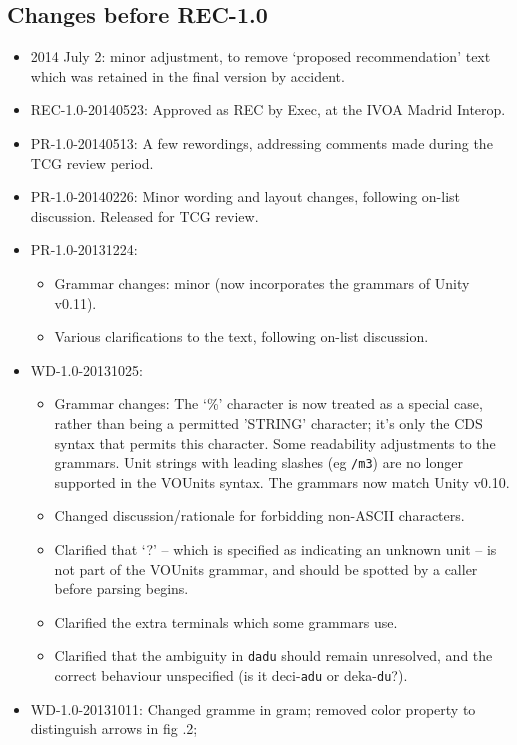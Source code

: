 \documentclass[11pt,a4paper]{ivoa}
\newcommand{\unit}[1]{\texttt{\small\color{orange}#1}}
\begin{document}
\subsection{Changes before REC-1.0}

\begin{itemize}
\item 2014 July 2: minor adjustment, to remove `proposed
recommendation' text which was retained in the final version by accident.
\item REC-1.0-20140523: Approved as REC by Exec, at the IVOA Madrid Interop.
\item PR-1.0-20140513:
A few rewordings, addressing comments made during the TCG review period.
\item PR-1.0-20140226:
Minor wording and layout changes, following on-list discussion.
Released for TCG review.
\item PR-1.0-20131224:
\begin{itemize}
\item Grammar changes: minor (now incorporates the grammars of Unity v0.11).
\item Various clarifications to the text, following on-list discussion.
\end{itemize}
\item WD-1.0-20131025:
\begin{itemize}
\item Grammar changes: The `\%' character is now treated as a special
    case, rather than being a permitted 'STRING' character; it's only
    the CDS syntax that permits this character.  Some readability
    adjustments to the grammars.  Unit strings with leading slashes
    (eg \unit{/m3}) are no longer supported in the VOUnits syntax.
    The grammars now match Unity v0.10.
\item Changed discussion/rationale for forbidding non-ASCII
    characters.
\item Clarified that `?' -- which is specified as indicating an
    unknown unit -- is not part of the VOUnits grammar, and should be
    spotted by a caller before parsing begins.
\item Clarified the extra terminals which some grammars use.
\item Clarified that the ambiguity in \unit{dadu} should remain
    unresolved, and the correct behaviour unspecified (is it
    deci-\texttt{adu} or deka-\texttt{du}?).
\end{itemize}
\item WD-1.0-20131011: Changed gramme in gram; removed color property to distinguish arrows in fig .2;

\end{itemize}
\end{document}
